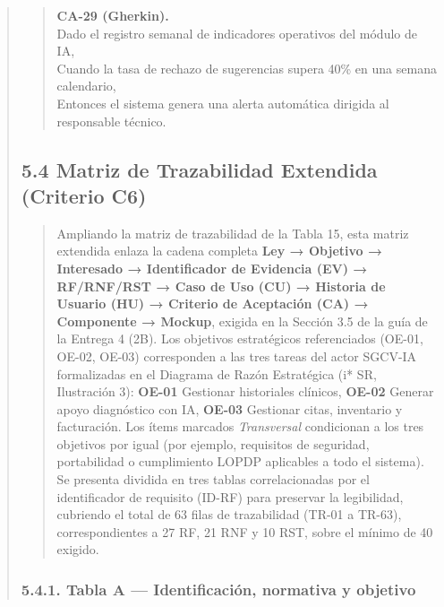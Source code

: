 \documentclass[
]{article}
\begin{document}
\begin{quote}
\begin{quote}
\textbf{CA-29 (Gherkin).} \\
Dado el registro semanal de indicadores operativos del módulo de IA, \\
Cuando la tasa de rechazo de sugerencias supera 40\% en una semana calendario, \\
Entonces el sistema genera una alerta automática dirigida al responsable técnico.
\end{quote}
\subsection{5.4 Matriz de Trazabilidad Extendida (Criterio C6)}\label{matriz-de-trazabilidad-extendida}

\begin{quote}
Ampliando la matriz de trazabilidad de la Tabla 15, esta matriz extendida
enlaza la cadena completa \textbf{Ley → Objetivo → Interesado → Identificador
de Evidencia (EV) → RF/RNF/RST → Caso de Uso (CU) → Historia de Usuario (HU)
→ Criterio de Aceptación (CA) → Componente → Mockup}, exigida en la Sección
3.5 de la guía de la Entrega 4 (2B). Los objetivos estratégicos referenciados
(OE-01, OE-02, OE-03) corresponden a las tres tareas del actor SGCV-IA
formalizadas en el Diagrama de Razón Estratégica (i* SR, Ilustración 3):
\textbf{OE-01} Gestionar historiales clínicos, \textbf{OE-02} Generar apoyo
diagnóstico con IA, \textbf{OE-03} Gestionar citas, inventario y facturación.
Los ítems marcados \emph{Transversal} condicionan a los tres objetivos por
igual (por ejemplo, requisitos de seguridad, portabilidad o cumplimiento
LOPDP aplicables a todo el sistema). Se presenta dividida en tres tablas
correlacionadas por el identificador de requisito (ID-RF) para preservar la
legibilidad, cubriendo el total de 63 filas de trazabilidad (TR-01 a
TR-63), correspondientes a 27 RF, 21 RNF y 10 RST, sobre el
mínimo de 40 exigido.
\end{quote}

\subsubsection{5.4.1. Tabla A --- Identificación, normativa y objetivo}\label{matriz-extendida-tabla-a}


\end{quote}
\end{document}
